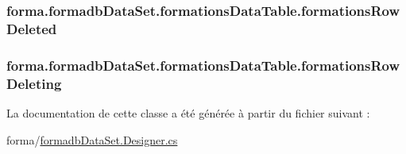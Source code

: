 \subsubsection[{\texorpdfstring{formations\+Row\+Deleted}{formationsRowDeleted}}]{ forma.\+formadb\+Data\+Set.\+formations\+Data\+Table.\+formations\+Row\+Deleted}\hypertarget{classforma_1_1formadb_data_set_1_1formations_data_table_aae20f1168d3617882d07f460f42c0cf1}{}\label{classforma_1_1formadb_data_set_1_1formations_data_table_aae20f1168d3617882d07f460f42c0cf1}
\subsubsection[{\texorpdfstring{formations\+Row\+Deleting}{formationsRowDeleting}}]{ forma.\+formadb\+Data\+Set.\+formations\+Data\+Table.\+formations\+Row\+Deleting}\hypertarget{classforma_1_1formadb_data_set_1_1formations_data_table_acfae0c1f09c21faaae6766f4eb483bc6}{}\label{classforma_1_1formadb_data_set_1_1formations_data_table_acfae0c1f09c21faaae6766f4eb483bc6}


La documentation de cette classe a été générée à partir du fichier suivant \+:\begin{DoxyCompactItemize}
\item 
forma/\hyperlink{formadb_data_set_8_designer_8cs}{formadb\+Data\+Set.\+Designer.\+cs}\end{DoxyCompactItemize}
